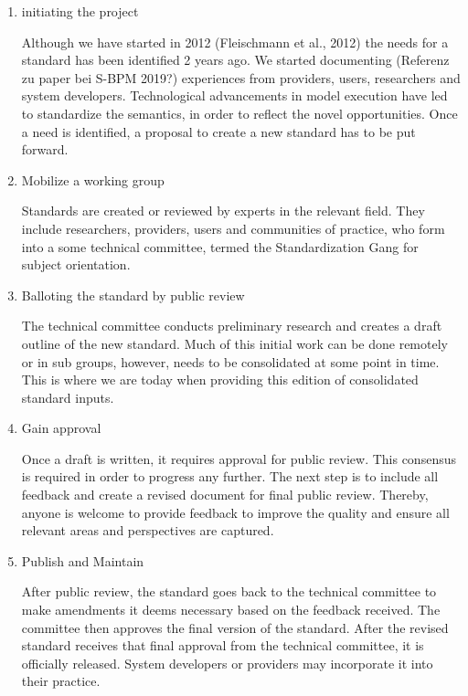 \begin{enumerate}
	\item initiating the project

Although we have started in 2012 (Fleischmann et al., 2012) the needs for a standard has been identified 2 years ago. We started documenting (Referenz zu paper bei S-BPM 2019?) experiences from providers, users, researchers and system developers. Technological advancements in model execution have led to standardize the semantics, in order to reflect the novel opportunities. Once a need is identified, a proposal to create a new standard has to be put forward.

 \item  Mobilize a working group

Standards are created or reviewed by experts in the relevant field. They include researchers, providers, users and communities of practice, who form into a some technical committee, termed the Standardization Gang for subject orientation.

\item Balloting the standard by public review 

The technical committee conducts preliminary research and creates a draft outline of the new standard. Much of this initial work can be done remotely or in sub groups, however, needs to be consolidated at some point in time. This is where we are today when providing this edition of consolidated standard inputs.

\item Gain approval 

Once a draft is written, it requires approval for public review. This consensus is required in order to progress any further. The next step is to include all feedback and create a revised document for final public review. Thereby, anyone is welcome to provide feedback to improve the quality and ensure all relevant areas and perspectives are captured.

\item Publish and Maintain 

After public review, the standard goes back to the technical committee to make amendments it deems necessary based on the feedback received. The committee then approves the final version of the standard. After the revised standard receives that final approval from the technical committee, it is officially released. System developers or providers may incorporate it into their practice.

\end{enumerate}


